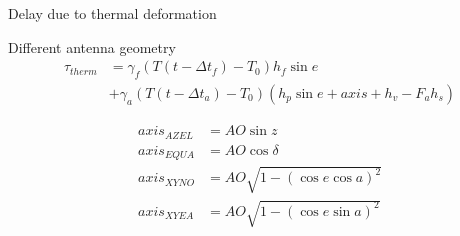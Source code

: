 \documentclass[14pt,table,t, c]{beamer}
\begin{document}
\begin{frame}{Delay due to thermal deformation}

\begin{block}{Different antenna geometry}
\small
\vspace*{-\baselineskip}\setlength\belowdisplayskip{0pt}\setlength\abovedisplayskip{0pt}
\begin{align*}
\tau_{therm} &= \gamma_f (T(t - \Delta t_f) - T_0) h_f \sin e \\
             &+ \gamma_a (T(t - \Delta t_a) - T_0) (h_p \sin e + axis + h_v - F_a h_s)
\end{align*}
\end{block}
\begin{block}{\vspace*{-3ex}}
\vspace*{-\baselineskip}\setlength\belowdisplayskip{0pt}\setlength\abovedisplayskip{0pt}
\begin{align*}
axis_{AZEL} &= AO \sin z \\
axis_{EQUA} &= AO \cos \delta \\
axis_{XYNO} &= AO \sqrt{1 - (\cos e \cos a)^2} \\
axis_{XYEA} &= AO \sqrt{1 - (\cos e \sin a)^2}
\end{align*}
\end{block}
\end{frame}
\end{document}

